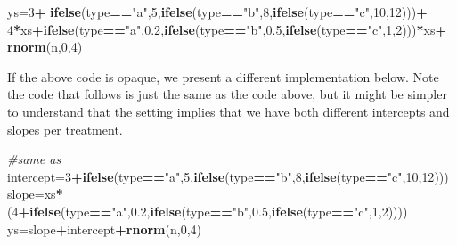\documentclass[
]{book}
\newenvironment{Shaded}{\begin{snugshade}}{\end{snugshade}}
\newcommand{\CommentTok}[1]{\textcolor[rgb]{0.56,0.35,0.01}{\textit{#1}}}
\newcommand{\DecValTok}[1]{\textcolor[rgb]{0.00,0.00,0.81}{#1}}
\newcommand{\FloatTok}[1]{\textcolor[rgb]{0.00,0.00,0.81}{#1}}
\newcommand{\FunctionTok}[1]{\textcolor[rgb]{0.13,0.29,0.53}{\textbf{#1}}}
\newcommand{\NormalTok}[1]{#1}
\newcommand{\OtherTok}[1]{\textcolor[rgb]{0.56,0.35,0.01}{#1}}
\newcommand{\SpecialCharTok}[1]{\textcolor[rgb]{0.81,0.36,0.00}{\textbf{#1}}}
\newcommand{\StringTok}[1]{\textcolor[rgb]{0.31,0.60,0.02}{#1}}
\begin{document}
\begin{Shaded}
\begin{Highlighting}[]
\NormalTok{ys}\OtherTok{=}\DecValTok{3}\SpecialCharTok{+}
\FunctionTok{ifelse}\NormalTok{(type}\SpecialCharTok{==}\StringTok{"a"}\NormalTok{,}\DecValTok{5}\NormalTok{,}\FunctionTok{ifelse}\NormalTok{(type}\SpecialCharTok{==}\StringTok{"b"}\NormalTok{,}\DecValTok{8}\NormalTok{,}\FunctionTok{ifelse}\NormalTok{(type}\SpecialCharTok{==}\StringTok{"c"}\NormalTok{,}\DecValTok{10}\NormalTok{,}\DecValTok{12}\NormalTok{)))}\SpecialCharTok{+}
\DecValTok{4}\SpecialCharTok{*}\NormalTok{xs}\SpecialCharTok{+}\FunctionTok{ifelse}\NormalTok{(type}\SpecialCharTok{==}\StringTok{"a"}\NormalTok{,}\FloatTok{0.2}\NormalTok{,}\FunctionTok{ifelse}\NormalTok{(type}\SpecialCharTok{==}\StringTok{"b"}\NormalTok{,}\FloatTok{0.5}\NormalTok{,}\FunctionTok{ifelse}\NormalTok{(type}\SpecialCharTok{==}\StringTok{"c"}\NormalTok{,}\DecValTok{1}\NormalTok{,}\DecValTok{2}\NormalTok{)))}\SpecialCharTok{*}\NormalTok{xs}\SpecialCharTok{+}
\FunctionTok{rnorm}\NormalTok{(n,}\DecValTok{0}\NormalTok{,}\DecValTok{4}\NormalTok{)}
\end{Highlighting}
\end{Shaded}

If the above code is opaque, we present a different implementation below. Note the code that follows is just the same as the code above, but it might be simpler to understand that the setting implies that we have both different intercepts and slopes per treatment.

\begin{Shaded}
\begin{Highlighting}[]
\CommentTok{\#same as}
\NormalTok{intercept}\OtherTok{=}\DecValTok{3}\SpecialCharTok{+}\FunctionTok{ifelse}\NormalTok{(type}\SpecialCharTok{==}\StringTok{"a"}\NormalTok{,}\DecValTok{5}\NormalTok{,}\FunctionTok{ifelse}\NormalTok{(type}\SpecialCharTok{==}\StringTok{"b"}\NormalTok{,}\DecValTok{8}\NormalTok{,}\FunctionTok{ifelse}\NormalTok{(type}\SpecialCharTok{==}\StringTok{"c"}\NormalTok{,}\DecValTok{10}\NormalTok{,}\DecValTok{12}\NormalTok{)))}
\NormalTok{slope}\OtherTok{=}\NormalTok{xs}\SpecialCharTok{*}\NormalTok{(}\DecValTok{4}\SpecialCharTok{+}\FunctionTok{ifelse}\NormalTok{(type}\SpecialCharTok{==}\StringTok{"a"}\NormalTok{,}\FloatTok{0.2}\NormalTok{,}\FunctionTok{ifelse}\NormalTok{(type}\SpecialCharTok{==}\StringTok{"b"}\NormalTok{,}\FloatTok{0.5}\NormalTok{,}\FunctionTok{ifelse}\NormalTok{(type}\SpecialCharTok{==}\StringTok{"c"}\NormalTok{,}\DecValTok{1}\NormalTok{,}\DecValTok{2}\NormalTok{))))}
\NormalTok{ys}\OtherTok{=}\NormalTok{slope}\SpecialCharTok{+}\NormalTok{intercept}\SpecialCharTok{+}\FunctionTok{rnorm}\NormalTok{(n,}\DecValTok{0}\NormalTok{,}\DecValTok{4}\NormalTok{)}
\end{Highlighting}
\end{Shaded}
\end{document}

